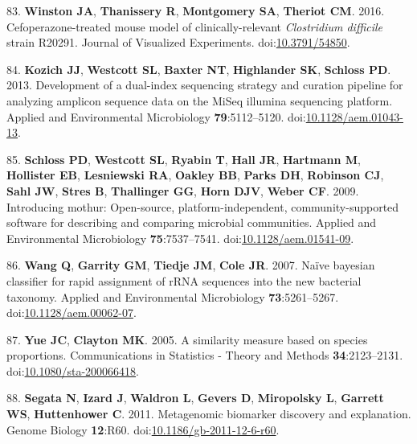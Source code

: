 \documentclass[
  12pt,
]{article}
\newenvironment{cslreferences}%
  {}%
  {\par}
\begin{document}
\begin{cslreferences}
\leavevmode\hypertarget{ref-Winston2016}{}%
83. \textbf{Winston JA}, \textbf{Thanissery R}, \textbf{Montgomery SA},
\textbf{Theriot CM}. 2016. Cefoperazone-treated mouse model of
clinically-relevant \emph{Clostridium difficile} strain R20291. Journal
of Visualized Experiments.
doi:\href{https://doi.org/10.3791/54850}{10.3791/54850}.

\leavevmode\hypertarget{ref-Kozich2013}{}%
84. \textbf{Kozich JJ}, \textbf{Westcott SL}, \textbf{Baxter NT},
\textbf{Highlander SK}, \textbf{Schloss PD}. 2013. Development of a
dual-index sequencing strategy and curation pipeline for analyzing
amplicon sequence data on the MiSeq illumina sequencing platform.
Applied and Environmental Microbiology \textbf{79}:5112--5120.
doi:\href{https://doi.org/10.1128/aem.01043-13}{10.1128/aem.01043-13}.

\leavevmode\hypertarget{ref-Schloss2009}{}%
85. \textbf{Schloss PD}, \textbf{Westcott SL}, \textbf{Ryabin T},
\textbf{Hall JR}, \textbf{Hartmann M}, \textbf{Hollister EB},
\textbf{Lesniewski RA}, \textbf{Oakley BB}, \textbf{Parks DH},
\textbf{Robinson CJ}, \textbf{Sahl JW}, \textbf{Stres B},
\textbf{Thallinger GG}, \textbf{Horn DJV}, \textbf{Weber CF}. 2009.
Introducing mothur: Open-source, platform-independent,
community-supported software for describing and comparing microbial
communities. Applied and Environmental Microbiology
\textbf{75}:7537--7541.
doi:\href{https://doi.org/10.1128/aem.01541-09}{10.1128/aem.01541-09}.

\leavevmode\hypertarget{ref-Wang2007}{}%
86. \textbf{Wang Q}, \textbf{Garrity GM}, \textbf{Tiedje JM},
\textbf{Cole JR}. 2007. Naïve bayesian classifier for rapid assignment
of rRNA sequences into the new bacterial taxonomy. Applied and
Environmental Microbiology \textbf{73}:5261--5267.
doi:\href{https://doi.org/10.1128/aem.00062-07}{10.1128/aem.00062-07}.

\leavevmode\hypertarget{ref-Yue2005}{}%
87. \textbf{Yue JC}, \textbf{Clayton MK}. 2005. A similarity measure
based on species proportions. Communications in Statistics - Theory and
Methods \textbf{34}:2123--2131.
doi:\href{https://doi.org/10.1080/sta-200066418}{10.1080/sta-200066418}.

\leavevmode\hypertarget{ref-Segata2011}{}%
88. \textbf{Segata N}, \textbf{Izard J}, \textbf{Waldron L},
\textbf{Gevers D}, \textbf{Miropolsky L}, \textbf{Garrett WS},
\textbf{Huttenhower C}. 2011. Metagenomic biomarker discovery and
explanation. Genome Biology \textbf{12}:R60.
doi:\href{https://doi.org/10.1186/gb-2011-12-6-r60}{10.1186/gb-2011-12-6-r60}.


\end{cslreferences}
\end{document}
